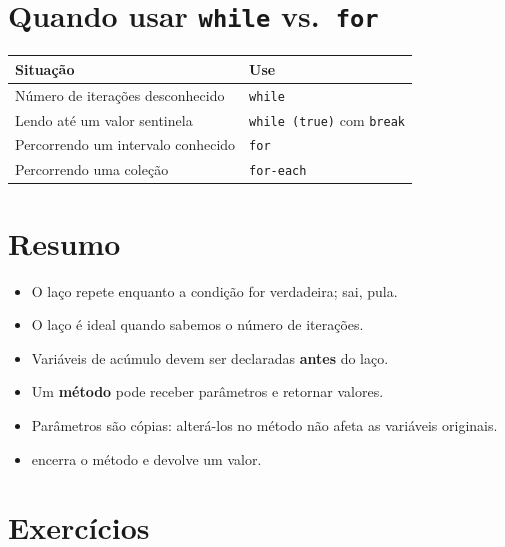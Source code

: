 \documentclass[11pt,a4paper]{article}
\begin{document}
\section{Quando usar \texttt{while} vs.\ \texttt{for}}

\begin{center}
\begin{tabular}{l l}
\toprule
\textbf{Situação} & \textbf{Use} \\
\midrule
Número de iterações desconhecido & \texttt{while} \\
Lendo até um valor sentinela & \texttt{while (true)} com \texttt{break} \\
Percorrendo um intervalo conhecido & \texttt{for} \\
Percorrendo uma coleção & \texttt{for-each} \\
\bottomrule
\end{tabular}
\end{center}

\section{Resumo}

\begin{itemize}
  \item O laço  repete enquanto a condição for verdadeira;  sai,  pula.
  \item O laço  é ideal quando sabemos o número de iterações.
  \item Variáveis de acúmulo devem ser declaradas \textbf{antes} do laço.
  \item Um \textbf{método} pode receber parâmetros e retornar valores.
  \item Parâmetros são cópias: alterá-los no método não afeta as variáveis originais.
  \item {} encerra o método e devolve um valor.
\end{itemize}

\section{Exercícios}
\end{document}
